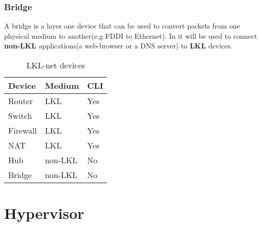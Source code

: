 \subsubsection{Bridge}

A bridge is a layer one device that can be used to convert packets from one physical medium to another(e.g FDDI to Ethernet). In 
\textbf{\project} it will be used to connect \textbf{non-LKL} applications(a web-browser or a DNS server) to \textbf{LKL} devices.

\begin{center}
  \begin{table}[htb]
  \begin{center}
  \begin{tabular}{ | l | l | l |}
    \hline
      Device & Medium & CLI\\ \hline
      Router & LKL & Yes \\ \hline
      Switch & LKL & Yes \\ \hline
      Firewall & LKL & Yes \\ \hline
      NAT & LKL & Yes \\ \hline
      Hub & non-LKL & No \\ \hline
      Bridge & non-LKL & No \\ 
    \hline
  \end{tabular}
  \end{center}
  \caption{LKL-net devices}
  \label{table:tdevices}
  \end{table}
\end{center}

\section{Hypervisor}
\label{sub-sec:hypervisor}
